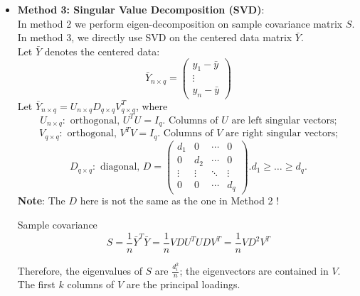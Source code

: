 \documentclass[12pt]{book}
\theoremstyle{definition}
\theoremstyle{remark}
\begin{document}
\begin{enumerate}
\begin{itemize}
    \item \textbf{Method 3: Singular Value Decomposition (SVD)}:\\\label{sec:S}
    In method 2 we perform eigen-decomposition on sample covariance matrix $S$. In method 3, we directly use SVD on the centered data matrix $\bar{Y}$.\\

    Let $\bar{Y}$ denotes the centered data: \[
    \bar{Y}_{n\times q} = \begin{pmatrix}y_1-\bar{y}
 \\\vdots
 \\y_n-\bar{y}

\end{pmatrix}
    \]
Let $\bar{Y}_{n\times q} = U_{n\times q}D_{q\times q}V_{q\times q}^T$, where 
\[U_{n\times q}: \text{ orthogonal, } U^TU = I_q. \text{ Columns of $U$ are left singular vectors;}\]
\[V_{q\times q}: \text{ orthogonal, } V^TV = I_q. \text{ Columns of $V$ are right singular vectors;}\]
\[D_{q\times q}: \text{ diagonal, } D = \begin{pmatrix}  
  d_1 & 0 & \cdots & 0 \\  
  0 & d_2 & \cdots & 0 \\  
  \vdots & \vdots & \ddots & \vdots \\  
  0 & 0 & \cdots & d_q  
\end{pmatrix}. d_1\ge \dots \ge d_q. \]
\textbf{Note}: The $D$ here is not the same as the one in Method 2 !

Sample covariance \[S = \frac{1}{n}\bar{Y}^T\bar{Y} = \frac{1}{n}VDU^TUDV^T = \frac{1}{n}VD^2V^T\]

Therefore, the eigenvalues of $S$ are $\frac{d_i^2}{n}$; the eigenvectors are contained in $V$. The first $k$ columns of $V$ are the principal loadings.
\end{itemize}


\end{enumerate}
\end{document}
